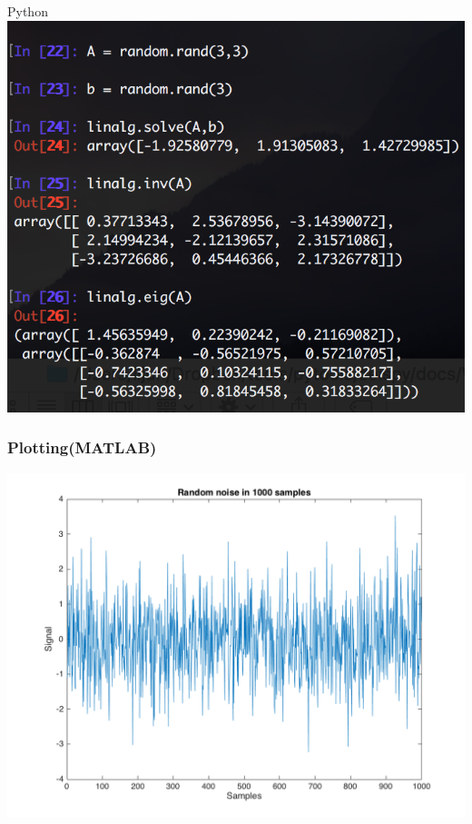 \documentclass[compress]{beamer}
\begin{document}
\begin{frame}
\begin{minipage}{0.35\textwidth}
	\end{minipage}
	\begin{minipage}{0.53\textwidth}
		\centering
		Python\\
		\includegraphics[width=\textwidth]{fig/python_la}
	\end{minipage}
\end{frame}

\begin{frame}
	\frametitle{Plotting(MATLAB)}
	\centering
	\includegraphics[width=\textwidth]{fig/matlab_plot}
\end{frame}
\end{document}
